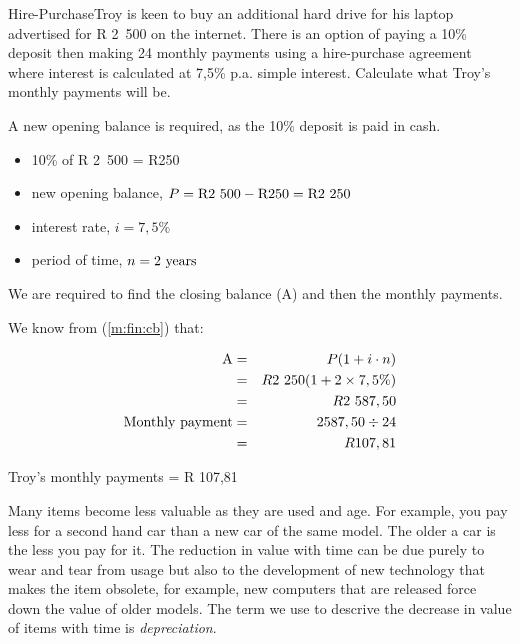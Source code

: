 \documentclass[10pt,a4paper,titlepage,twoside,openright]{report}
\begin{document}
\begin{wex}{Hire-Purchase}{Troy is keen to buy an additional hard drive for his laptop advertised for R 2~500 on the internet.  There is an option of paying a 10\% deposit then making 24 monthly payments using a hire-purchase agreement where interest is calculated at 7,5\% p.a. simple interest.  Calculate what Troy's monthly payments will be.}{
A new opening balance is required, as the 10\% deposit is paid in cash.\\

\begin{itemize}[topsep=0ex, partopsep=\parskip,itemsep=\parskip]
\item{10\% of R 2~500 = R250}
\item{new opening balance, $P=\rm{R}2~500 - \rm{R}250 = \rm{R}2~250$}
\item{interest rate, $i=7,5\%$}
\item{period of time, $n=2~\rm{years}$}
\end{itemize}
\vspace{0.5cm}
We are required to find the closing balance (A) and then the monthly payments.

We know from (\ref{m:fin:cb}) that:

\begin{eqnarray*}
\mbox{A} &=& P (1 + i\cdot n)\\
&=& R2~250 (1 + 2\times 7,5\%)\\
&=& R2~587,50\\
\vspace{0.5cm}
\mbox{Monthly payment}&=&2587,50\div{24}\\
&=& R 107,81
\end{eqnarray*}

Troy's monthly payments = R 107,81
}
\end{wex}

Many items become less valuable as they are used and age. For example, you pay less for a second hand car than a new car of the same model. The older a car is the less you pay for it. The reduction in value with time can be due purely to wear and tear from usage but also to the development of new technology that makes the item obsolete, for example, new computers that are released force down the value of older models. The term we use to descrive the decrease in value of items with time is \textit{depreciation}. 
\end{document}
